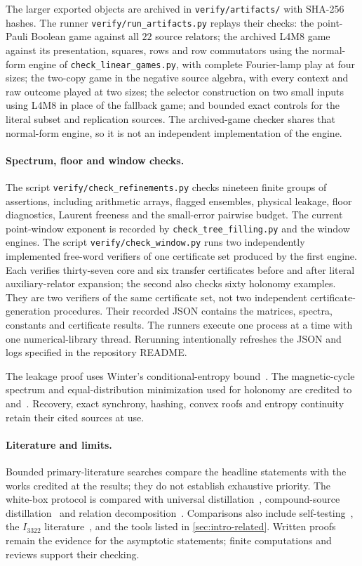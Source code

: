 The larger exported objects are archived in \texttt{verify/artifacts/} with SHA-256 hashes. The runner \texttt{verify/run\_artifacts.py} replays their checks: the point-Pauli Boolean game against all $22$ source relators; the archived L4M8 game against its presentation, squares, rows and row commutators using the normal-form engine of \texttt{check\_linear\_games.py}, with complete Fourier-lamp play at four sizes; the two-copy game in the negative source algebra, with every context and raw outcome played at two sizes; the selector construction on two small inputs using L4M8 in place of the fallback game; and bounded exact controls for the literal subset and replication sources. The archived-game checker shares that normal-form engine, so it is not an independent implementation of the engine.

\paragraph{Spectrum, floor and window checks.} The script \texttt{verify/check\_refinements.py} checks nineteen finite groups of assertions, including arithmetic arrays, flagged ensembles, physical leakage, floor diagnostics, Laurent freeness and the small-error pairwise budget. The current point-window exponent is recorded by \texttt{check\_tree\_filling.py} and the window engines. The script \texttt{verify/check\_window.py} runs two independently implemented free-word verifiers of one certificate set produced by the first engine. Each verifies thirty-seven core and six transfer certificates before and after literal auxiliary-relator expansion; the second also checks sixty holonomy examples. They are two verifiers of the same certificate set, not two independent certificate-generation procedures. Their recorded JSON contains the matrices, spectra, constants and certificate results. The runners execute one process at a time with one numerical-library thread. Rerunning intentionally refreshes the JSON and logs specified in the repository README.

The leakage proof uses Winter's conditional-entropy bound~\cite[Lemma~2]{Winter16}. The magnetic-cycle spectrum and equal-distribution minimization used for holonomy are credited to~\cite[Lemma~2.9]{CTT11} and~\cite[Proposition~4.6(b)]{BGKLM20}. Recovery, exact synchrony, hashing, convex roofs and entropy continuity retain their cited sources at use.

\paragraph{Literature and limits.} Bounded primary-literature searches compare the headline statements with the works credited at the results; they do not establish exhaustive priority. The white-box protocol is compared with universal distillation~\cite{TWMAH26,TMGL26}, compound-source distillation~\cite{BJ14} and relation decomposition~\cite{MSZ23}. Comparisons also include self-testing~\cite{Bap25,VZ26,CZ26}, the $I_{3322}$ literature~\cite{Pau26,Col26}, and the tools listed in \cref{sec:intro-related}. Written proofs remain the evidence for the asymptotic statements; finite computations and reviews support their checking.
